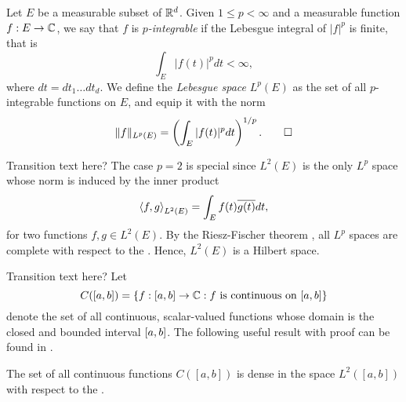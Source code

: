 \documentclass[../thesis.tex]{subfiles}
\begin{document}
\begin{definition}[Lebesgue Space] %
    Let $E$ be a measurable subset of $\mathbb{R}^d$. Given $1 \leq p < \infty$ and a measurable function $f:E\rightarrow \mathbb{C}$, we say that $f$ is \emph{$p$-integrable} if the Lebesgue integral of $|f|^p$ is finite, that is
    \begin{equation*}
        \int_{E} |f(t)|^p dt < \infty,
    \end{equation*}
    where $dt= dt_1 \dots dt_d$. We define the \emph{Lebesgue space} $L^p(E)$ as the set of all $p$-integrable functions on $E$, and equip it with the norm
    \begin{equation*}
        \|f\|_{L^p(E)} = \left(\int_{E} |f(t)|^p dt\right)^{1/p}. \qedhere
    \end{equation*}
\end{definition}

\colorbox{BurntOrange}{Transition text here?} %
The case $p=2$ is special since $L^2(E)$ is the only $L^p$ space whose norm is induced by the inner product
\begin{equation*}
    \left \langle f, g \right \rangle_{L^2(E)} = \int_{E} f(t)\overline{g(t)} dt,
\end{equation*}
for two functions $f,g\in L^2(E)$. By the Riesz-Fischer theorem \cite[p.~279]{heilIntroductionRealAnalysis2019}, all $L^p$ spaces are complete with respect to the \LPnorm. Hence, $L^2(E)$ is a Hilbert space. 

\colorbox{BurntOrange}{Transition text here?} %
Let
\begin{equation*}  %
    C([a,b]) = \braq{f:[a,b] \rightarrow \mathbb{C}: f \text{ is continuous on } [a,b]}
\end{equation*}
denote the set of all continuous, scalar-valued functions whose domain is the closed and bounded interval $[a,b]$. The following useful result with proof can be found in \cite[p.~326]{rudinPrinciplesMathematicalAnalysis20}. 
\begin{lemma}\label{lem:c_dense_L2}
    The set of all continuous functions $C([a,b])$ is dense in the space $L^2([a,b])$ with respect to the \Ltwonorm.
\end{lemma}
\end{document}
